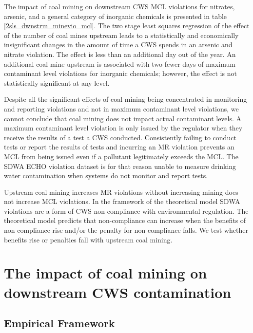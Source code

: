 \documentclass{article}
\begin{document}
The impact of coal mining on downstream CWS MCL violations for nitrates, arsenic, and a general category of inorganic chemicals is presented in table \ref{2sls_dwnstrm_minevio_mcl}. The two stage least squares regression of the effect of the number of coal mines upstream leads to a statistically and economically insignificant changes in the amount of time a CWS spends in an arsenic and nitrate violation. The effect is less than an additional day out of the year. An additional coal mine upstream is associated with two fewer days of maximum contaminant level violations for inorganic chemicals; however, the effect is not statistically significant at any level.

Despite all the significant effects of coal mining being concentrated in monitoring and reporting violations and not in maximum contaminant level violations, we cannot conclude that coal mining does not impact actual contaminant levels. A maximum contaminant level violation is only issued by the regulator when they receive the results of a test a CWS conducted. Consistently failing to conduct tests or report the results of tests and incurring an MR violation prevents an MCL from being issued even if a pollutant legitimately exceeds the MCL. The SDWA ECHO violation dataset is for that reason unable to measure drinking water contamination when systems do not monitor and report tests.

Upstream coal mining increases MR violations without increasing mining does not increase MCL violations. In the framework of the theoretical model SDWA violations are a form of CWS non-compliance with environmental regulation. The theoretical model predicts that non-compliance can increase when the benefits of non-compliance rise and/or the penalty for non-compliance falls. We test whether benefits rise or penalties fall with upstream coal mining.







\section{The impact of coal mining on downstream CWS contamination }

\subsection{Empirical Framework}
\end{document}
